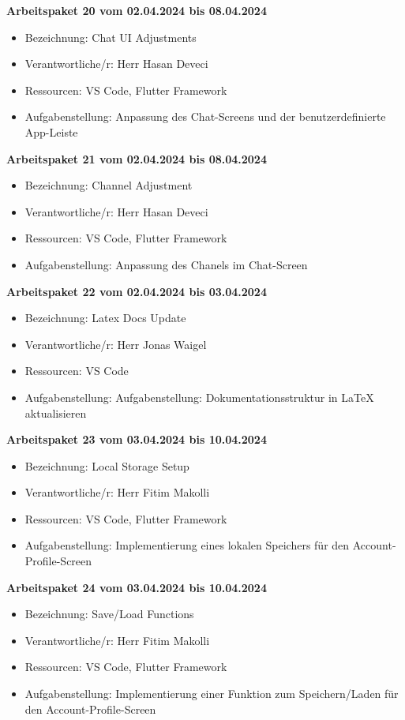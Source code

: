 \textbf{Arbeitspaket 20 vom 02.04.2024 bis 08.04.2024}
\begin{itemize}[itemsep=0pt]
    \item{Bezeichnung: Chat UI Adjustments} 
	\item{Verantwortliche/r: Herr Hasan Deveci} 
	\item{Ressourcen: VS Code, Flutter Framework} 
    \item{Aufgabenstellung: Anpassung des Chat-Screens und der benutzerdefinierte App-Leiste}
\end{itemize}

\textbf{Arbeitspaket 21 vom 02.04.2024 bis 08.04.2024}
\begin{itemize}[itemsep=0pt]
    \item{Bezeichnung: Channel Adjustment} 
	\item{Verantwortliche/r: Herr Hasan Deveci} 
	\item{Ressourcen: VS Code, Flutter Framework} 
    \item{Aufgabenstellung: Anpassung des Chanels im Chat-Screen}
\end{itemize}

\textbf{Arbeitspaket 22 vom 02.04.2024 bis 03.04.2024}
\begin{itemize}[itemsep=0pt]
    \item{Bezeichnung: Latex Docs Update} 
	\item{Verantwortliche/r: Herr Jonas Waigel} 
	\item{Ressourcen: VS Code} 
    \item{Aufgabenstellung: Aufgabenstellung: Dokumentationsstruktur in LaTeX aktualisieren}
\end{itemize} 

\textbf{Arbeitspaket 23 vom 03.04.2024 bis 10.04.2024}
\begin{itemize}[itemsep=0pt]
    \item{Bezeichnung: Local Storage Setup} 
	\item{Verantwortliche/r: Herr Fitim Makolli} 
	\item{Ressourcen: VS Code, Flutter Framework} 
    \item{Aufgabenstellung: Implementierung eines lokalen Speichers für den Account-Profile-Screen}
\end{itemize}

\textbf{Arbeitspaket 24 vom 03.04.2024 bis 10.04.2024}
\begin{itemize}[itemsep=0pt]
    \item{Bezeichnung: Save/Load Functions} 
	\item{Verantwortliche/r: Herr Fitim Makolli} 
	\item{Ressourcen: VS Code, Flutter Framework} 
    \item{Aufgabenstellung: Implementierung einer Funktion zum Speichern/Laden für den Account-Profile-Screen}
\end{itemize}

